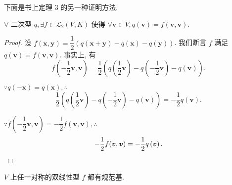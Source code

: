 \documentclass{ctexart}
\begin{document}
下面是书上定理 3 的另一种证明方法.
\begin{theorem}[书上的定理 3]
    $\forall$ 二次型 $q,\exists f\in\mathcal{L}_2(V,K)$ 使得 $\forall\boldsymbol{v}\in V,q(\boldsymbol{v})=f(\boldsymbol{v},\boldsymbol{v})$.
\end{theorem}
\begin{proof}
    设 $f(\boldsymbol{x},\boldsymbol{y})=\dfrac{1}{2}(q(\boldsymbol{x}+\boldsymbol{y})-q(\boldsymbol{x})-q(\boldsymbol{y}))$. 我们断言 $f$ 满足 $q(\boldsymbol{v})=f(\boldsymbol{v},\boldsymbol{v})$. 事实上, 有
    \[f\left(-\dfrac{1}{2}\boldsymbol{v},\boldsymbol{v}\right)=\dfrac{1}{2}\left(q\left(\dfrac{1}{2}\boldsymbol{v}\right)-q\left(-\dfrac{1}{2}\boldsymbol{v}\right)-q\left(\boldsymbol{v}\right)\right).\]

    $\because q(-\boldsymbol{x})=q(\boldsymbol{x}),\therefore$
    \[\dfrac{1}{2}\left(q\left(\dfrac{1}{2}\boldsymbol{v}\right)-q\left(-\dfrac{1}{2}\boldsymbol{v}\right)-q\left(\boldsymbol{v}\right)\right)=-\dfrac{1}{2}q\left(\boldsymbol{v}\right).\]

    $\because f\left(-\dfrac{1}{2}\boldsymbol{v},\boldsymbol{v}\right)=-\dfrac{1}{2}f(\boldsymbol{v},\boldsymbol{v}),\therefore$
    \[-\dfrac{1}{2}f(\boldsymbol{v},\boldsymbol{v})=-\dfrac{1}{2}q\left(\boldsymbol{v}\right).\qedhere\]
\end{proof}
\begin{theorem}[书上的定理 4]\label{t3.4}
    $V$ 上任一对称的双线性型 $f$ 都有规范基.
\end{theorem}
\end{document}
